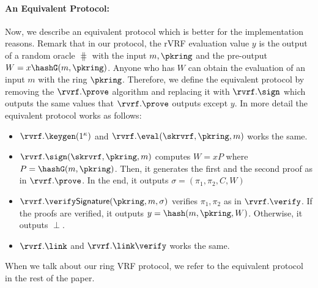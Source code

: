 \newcommand{\verifysign}{\ensuremath{\verify\mathsf{Signature}}}

\paragraph{An Equivalent Protocol:} Now, we describe an equivalent protocol which is better for the implementation reasons. Remark that in our protocol, the rVRF evaluation value $ y $ is the output of a random oracle $ \hash $ with the input $ m, \pkring $ and the pre-output $ W =  x \hashG(m, \pkring)$. Anyone who has $ W $ can obtain the evaluation of an input $ m $ with the ring $ \pkring $.  Therefore, we define the equivalent protocol by removing the  $\rvrf.\prove $ algorithm and replacing it with $ \rvrf.\sign $ which outputs the same values that  $\rvrf.\prove $ outputs except $ y $. In more detail the equivalent protocol works as follows:

\begin{itemize}
       \item  $ \rvrf.\keygen(1^\kappa) $ and $ \rvrf.\eval(\skrvrf,\pkring,m) $ works the same.
       \item $ \rvrf.\sign(\skrvrf, \pkring, m) $ computes $ W = xP $ where $ P  =  \hashG(m, \pkring)$.  Then, it generates the first and the second proof as in $ \rvrf.\prove $. In the end, it outputs $\sigma =  (\pi_1, \pi_2, C,W )$
       \item $ \rvrf.\verifysign(\pkring, m, \sigma) $ verifies $ \pi_1, \pi_2 $ as in $ \rvrf.\verify $. If the  proofs are verified, it outputs $ y = \hash(m, \pkring,W) $. Otherwise, it outputs $ \perp $.
       \item $ \rvrf.\link $ and $ \rvrf.\link\verify $ works the same.
\end{itemize}

When we talk about our ring VRF  protocol, we refer to the equivalent protocol in the rest of the paper.

